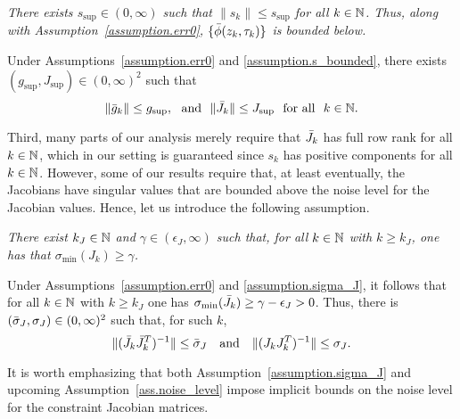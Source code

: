 \begin{assumption}\label{assumption.s_bounded}
  \textit{
  There exists $s_{\sup} \in (0,\infty)$ such that $\|s_k\| \leq s_{\sup}$ for all $k \in \mathbb{N}$.  Thus, along with Assumption~\ref{assumption.err0}, $\{{\bar \phi}(z_k,\tau_k) \}$ is bounded below.
  }
\end{assumption}

\noindent
Under Assumptions~\ref{assumption.err0} and \ref{assumption.s_bounded}, there exists $(g_{\sup}, J_{\sup}) \in (0, \infty)^2$ such that 
 \begin{equation}\label{eq.J_g_bnd}
   \|{\bar g}_k\|\leq  g_{\sup}, \ \ \text{and} \ \  \|{\bar J}_k \|\leq  J_{\sup} \ \  \text{for all} \ \ k \in \mathbb{N}.   
 \end{equation}

Third, many parts of our analysis merely require that ${\bar J}_k$ has full row rank for all $k \in \mathbb{N}$, which in our setting is guaranteed since $s_k$ has positive components for all $k \in \mathbb{N}$.  However, some of our results require that, at least eventually, the Jacobians have singular values that are bounded above the noise level for the Jacobian values.  Hence, let us introduce the following assumption.

\begin{assumption}\label{assumption.sigma_J}
  \textit{
  There exist $k_J \in \mathbb{N}$ and $\gamma \in (\epsilon_J,\infty)$ such that, for all $k \in \mathbb{N}$ with $k \geq k_J$, one has that $\sigma_{\min}(J_k) \geq \gamma$.
  }
\end{assumption}

\noindent
Under Assumptions~\ref{assumption.err0} and \ref{assumption.sigma_J}, it follows that for all $k \in \mathbb{N}$ with $k \geq k_J$ one has $\sigma_{\min}({\bar J}_k) \geq \gamma - \epsilon_J > 0$.  Thus, there is $({\bar \sigma}_J, \sigma_J) \in (0, \infty)^2$ such that, for such $k$,
\begin{equation}\label{eq.sigma_J}
   \| ({\bar J}_k {\bar J}_k^T)^{-1} \| \leq {\bar \sigma}_J   \quad \text{and} \quad  \| (J_k J_k^T)^{-1} \| \leq \sigma_J.
\end{equation}

\noindent
It is worth emphasizing that both Assumption~\ref{assumption.sigma_J} and upcoming Assumption~\ref{ass.noise_level} impose implicit bounds on the noise level for the constraint Jacobian matrices.


